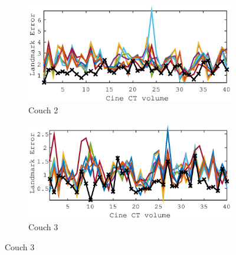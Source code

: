 \documentclass[11pt,a4paper,oneside]{report}
\begin{document}
\begin{figure}[H]
  \begin{subfigure}[b]{0.5\textwidth}
    \includegraphics[width=\textwidth, trim=0 0 0 0,clip=true]{figures/task4/landmark_error_couch2.eps}
    \caption{Couch 2}
  \end{subfigure}%
  \begin{subfigure}[b]{0.5\textwidth}
    \includegraphics[width=\textwidth, trim=0 0 0 0,clip=true]{figures/task4/landmark_error_couch3.eps}
    \caption{Couch 3}
  \end{subfigure}%
   

\end{figure}
\end{document}

